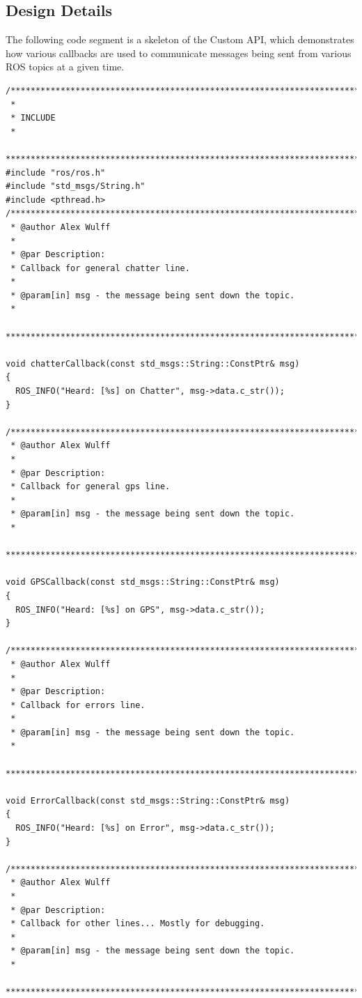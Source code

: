\subsection{Design Details}

The following code segment is a skeleton of the Custom API, which demonstrates how various callbacks are used to communicate messages being sent from various ROS topics at a given time.
\begin{lstlisting}
/******************************************************************************
 *
 * INCLUDE
 *
 *****************************************************************************/
#include "ros/ros.h"
#include "std_msgs/String.h"
#include <pthread.h>
/******************************************************************************
 * @author Alex Wulff
 *
 * @par Description:
 * Callback for general chatter line.
 *
 * @param[in] msg - the message being sent down the topic. 
 *
 *****************************************************************************/

void chatterCallback(const std_msgs::String::ConstPtr& msg)
{
  ROS_INFO("Heard: [%s] on Chatter", msg->data.c_str());
}

/******************************************************************************
 * @author Alex Wulff
 *
 * @par Description:
 * Callback for general gps line.
 *
 * @param[in] msg - the message being sent down the topic. 
 *
 *****************************************************************************/

void GPSCallback(const std_msgs::String::ConstPtr& msg)
{
  ROS_INFO("Heard: [%s] on GPS", msg->data.c_str());
}

/******************************************************************************
 * @author Alex Wulff
 *
 * @par Description:
 * Callback for errors line.
 *
 * @param[in] msg - the message being sent down the topic. 
 *
 *****************************************************************************/

void ErrorCallback(const std_msgs::String::ConstPtr& msg)
{
  ROS_INFO("Heard: [%s] on Error", msg->data.c_str());
}

/******************************************************************************
 * @author Alex Wulff
 *
 * @par Description:
 * Callback for other lines... Mostly for debugging.
 *
 * @param[in] msg - the message being sent down the topic. 
 *
 *****************************************************************************/


\end{lstlisting}
